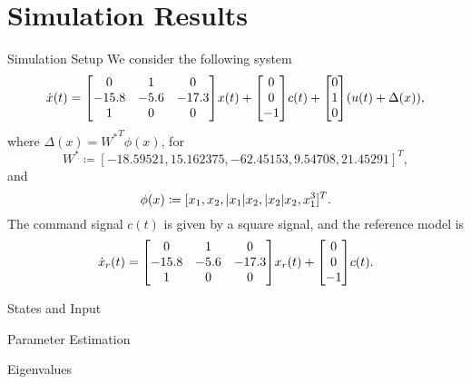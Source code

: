 \documentclass[handout]{beamer}
\theoremstyle{plain}
\theoremstyle{definition}
\theoremstyle{remark}
\begin{document}
\section{Simulation Results}

\begin{frame}{Simulation Setup}
	We consider the following system
	\begin{equation*}
		\dot{x}(t) = \mqty[0 & 1 & 0 \\ -15.8 & -5.6 & -17.3 \\ 1 & 0 & 0] x(t) +
		\mqty[0 \\ 0 \\ -1] c(t) + \mqty[0 \\ 1 \\ 0] \qty(u(t) + \Delta(x)),
	\end{equation*}
	where $\Delta(x) = {W^\ast}^T \phi(x)$, for
	\begin{equation*}
		W^\ast \coloneqq [-18.59521, 15.162375, -62.45153, 9.54708, 21.45291]^T,
	\end{equation*}
	and
	\begin{equation*}
		\phi(x) \coloneqq [x_1, x_2, \abs{x_1} x_2, \abs{x_2} x_2, x_1^3]^T.
	\end{equation*}
	The command signal $c(t)$ is given by a square signal, and the reference
	model is
	\begin{equation*}
		\dot{x}_r(t) = \mqty[0 & 1 & 0 \\ -15.8 & -5.6 & -17.3 \\ 1 & 0 & 0]
		x_r(t) + \mqty[0 \\ 0 \\ -1] c(t).
	\end{equation*}
\end{frame}

\begin{frame}{States and Input}
\end{frame}

\begin{frame}{Parameter Estimation}
\end{frame}

\begin{frame}{Eigenvalues}
\end{frame}
\end{document}
